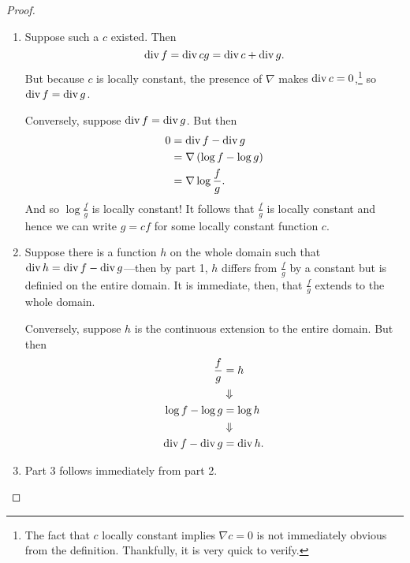 \begin{proof} \phantom{hello world}
\begin{enumerate}
  \item Suppose such a \(c\) existed. Then
        \[
          \operatorname{div} f = \operatorname{div} cg = \operatorname{div} c + \operatorname{div} g.
        \]
        But because \(c\) is locally constant, the presence of \(\nabla\) makes
        \(\operatorname{div} c =0\),\footnote{The fact that \(c\) locally constant implies
        \(\nabla c=0\) is not immediately obvious from the definition.
        Thankfully, it is very quick to verify.}
        so \(\operatorname{div} f = \operatorname{div} g\).

        Conversely, suppose \(\operatorname{div} f = \operatorname{div} g\). But then
        \begin{align*}
          0 &= \operatorname{div} f - \operatorname{div} g\\
            &= \nabla \left( \log f - \log g \right) \\
          &= \nabla\log \frac{f}{g}.
        \end{align*}
        And so \(\log  \frac{f}{g}\) is locally constant! It follows that
        \(\frac{f}{g} \) is locally constant and hence we can write \(g=cf\) for
        some locally constant function \(c\).

  \item Suppose there is a function \(h\) on the whole domain such that
        \(\operatorname{div} h = \operatorname{div} f - \operatorname{div} g\)---then by part 1, \(h\) differs from
        \(\frac{f}{g}\) by a constant but is definied on the entire domain. It
        is immediate, then, that \(\frac{f}{g}\) extends to the whole domain.

        Conversely, suppose \(h\) is the continuous extension to the entire
        domain. But then
        \begin{align*}
          \frac{f}{g} &= h \\
               & \Downarrow \\
          \log f - \log g &= \log h \\
               & \Downarrow \\
          \operatorname{div} f - \operatorname{div} g &= \operatorname{div} h.
        \end{align*}
  \item Part 3 follows immediately from part 2.
\end{enumerate}
\end{proof}

